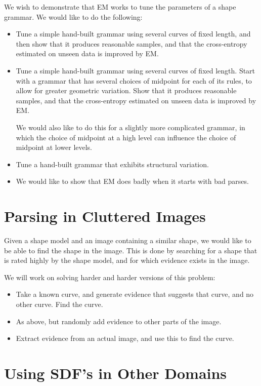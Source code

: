 \documentclass{book}
\begin{document}
We wish to demonstrate that EM works to tune the parameters of a shape
grammar. We would like to do the following:
\begin{itemize}
\item Tune a simple hand-built grammar using several curves of fixed
    length, and then show that it produces reasonable samples, and
    that the cross-entropy estimated on unseen data is improved by EM.
\item Tune a simple hand-built grammar using several curves of fixed
    length. Start with a grammar that has several choices of midpoint
    for each of its rules, to allow for greater geometric
    variation. Show that it produces reasonable samples, and that the
    cross-entropy estimated on unseen data is improved by EM.

    We would also like to do this for a slightly more complicated
    grammar, in which the choice of midpoint at a high level can
    influence the choice of midpoint at lower levels.
\item Tune a hand-built grammar that exhibits structural variation.
\item We would like to show that EM does badly when it starts with bad
    parses.
\end{itemize}
\section{Parsing in Cluttered Images}
\label{sec-2_5}

Given a shape model and an image containing a similar shape, we would
like to be able to find the shape in the image. This is done by
searching for a shape that is rated highly by the shape model, and for
which evidence exists in the image.

We will work on solving harder and harder versions of this problem:
\begin{itemize}
\item Take a known curve, and generate evidence that suggests that
    curve, and no other curve. Find the curve.
\item As above, but randomly add evidence to other parts of the image.
\item Extract evidence from an actual image, and use this to find the
    curve.
\end{itemize}
\section{Using SDF's in Other Domains}
\label{sec-2_6}
\end{document}
